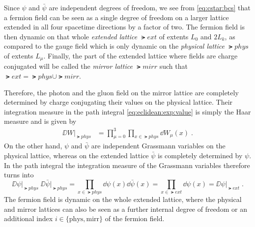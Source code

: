 Since $\psi$ and $\bar{\psi}$ are independent degrees of freedom, we see from \cref{eq:cstar:bcs} that a fermion field can be seen as a single degree of freedom on a larger lattice extended in all four spacetime directions by a factor of two.
The fermion field is then dynamic on that whole \emph{extended lattice} $\lat{ext}$ of extents $L_0$ and $2 L_{k}$, as compared to the gauge field which is only dynamic on the \emph{physical lattice} $\lat{phys}$ of extents $L_{\mu}$.
Finally, the part of the extended lattice where fields are charge conjugated will be called the \emph{mirror lattice} $\lat{mirr}$ such that $\lat{ext} = \lat{phys} \cup \lat{mirr}$.

Therefore, the photon and the gluon field on the mirror lattice are completely determined by charge conjugating their values on the physical lattice.
Their integration measure in the path integral \cref{eq:eclidean:exp:value} is simply the Haar measure and is given by
\begin{align}
\DD W \big\rvert_{\lat{phys}} &= \prod_{\mu=0}^{3} \prod_{x \in \lat{phys}} \dd W_{\mu}(x) \;.
\end{align}
On the other hand, $\psi$ and $\bar{\psi}$ are independent Grassmann variables on the physical lattice, whereas on the extended lattice $\bar{\psi}$ is completely determined by $\psi$. In the path integral the integration measure of the Grassmann variables therefore turns into
\begin{equation}
\DD \psi       \big\rvert_{\lat{phys}} \;
\DD \bar{\psi} \big\rvert_{\lat{phys}}
= \prod_{x \in \lat{phys}} \dd \psi(x) \dd \bar{\psi}(x)
= \prod_{x \in \lat{ext}}  \dd \psi(x)
= \DD \psi \big\rvert_{\lat{ext}} \;.
\end{equation}
The fermion field is dynamic on the whole extended lattice, where the physical and mirror lattices can also be seen as a further internal degree of freedom or an additional index $i \in \{ \text{phys}, \text{mirr} \}$ of the fermion field. 


